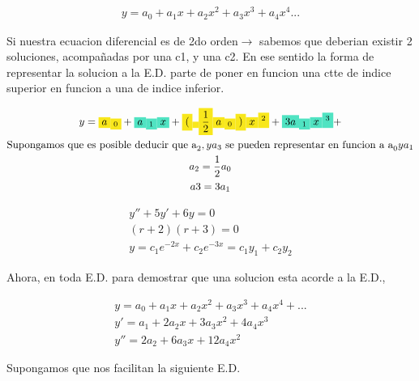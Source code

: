 \documentclass{article}
\begin{document}
\begin{gather*}
y = a_{0}+a_{1}x+a_{2}x^{2}+a_{3}x^{3}+ a_{4}x^{4}...
\end{gather*}


Si nuestra ecuacion diferencial es de 2do orden$\rightarrow$  sabemos que deberian existir 2 soluciones, acompañadas por una c1, y una c2. En ese sentido la forma de representar la solucion a la E.D. parte de \colorbox[RGB]{248,231,28}{poner en funcion una ctte de indice superior en funcion a una de indice inferior}.


\begin{gather*}
y = \text{\colorbox[RGB]{248,231,28}{$a$}}\text{\colorbox[RGB]{248,231,28}{$_{0}$}}+\text{\colorbox[RGB]{80,227,194}{$a$}}\text{\colorbox[RGB]{80,227,194}{$_{1}$}}\text{\colorbox[RGB]{80,227,194}{$x$}}+\text{\colorbox[RGB]{248,231,28}{$($}}\text{\colorbox[RGB]{248,231,28}{$ $}}\text{\colorbox[RGB]{248,231,28}{$\frac{1}{2}$}}\text{\colorbox[RGB]{248,231,28}{$a$}}\text{\colorbox[RGB]{248,231,28}{$_{0}$}}\text{\colorbox[RGB]{248,231,28}{$)$}}\text{\colorbox[RGB]{248,231,28}{$x$}}\text{\colorbox[RGB]{248,231,28}{$^{2}$}}+\text{\colorbox[RGB]{80,227,194}{$3a$}}\text{\colorbox[RGB]{80,227,194}{$_{1}$}}\text{\colorbox[RGB]{80,227,194}{$x$}}\text{\colorbox[RGB]{80,227,194}{$^{3}$}}+ \\
\text{Supongamos que es posible deducir que a}_{2}, y a_{3}\text{ se pueden representar en funcion a a}_{0} y a_{1} \\
a_{2}= \frac{1}{2}a_{0} \\
a3 = 3a_{1}
\end{gather*}





\begin{gather*}
y''+5y'+6y=0 \\
(r+2)(r+3)=0 \\
y = c_{1}e^{-2x}+c_{2}e^{-3x} = c_{1}y_{1}+c_{2}y_{2}
\end{gather*}


Ahora, en toda E.D. para demostrar que una solucion esta acorde a la E.D.,


\begin{gather*}
y = a_{0}+a_{1}x+a_{2}x^{2}+a_{3}x^{3}+ a_{4}x^{4}+... \\
y' = a_{1}+2a_{2}x+3a_{3}x^{2}+ 4a_{4}x^{3} \\
y'' = 2a_{2}+6a_{3}x+ 12a_{4}x^{2}
\end{gather*}


Supongamos que nos facilitan la siguiente E.D.
\end{document}
